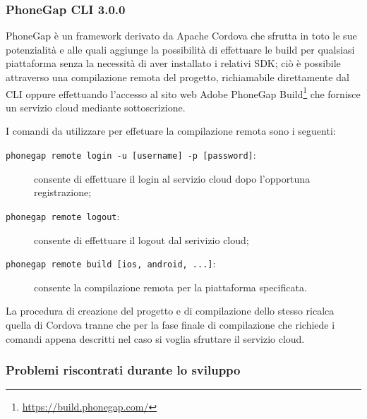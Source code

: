 \subsubsection{PhoneGap CLI 3.0.0}
PhoneGap è un framework derivato da Apache Cordova che sfrutta in toto le sue potenzialità e alle quali aggiunge la possibilità di effettuare le build per qualsiasi piattaforma senza la necessità di aver installato i relativi SDK; ciò è possibile attraverso una compilazione remota del progetto, richiamabile direttamente dal CLI oppure effettuando l'accesso al sito web Adobe PhoneGap Build\footnote{\url{https://build.phonegap.com/}} che fornisce un servizio cloud mediante sottoscrizione.

I comandi da utilizzare per effetuare la compilazione remota sono i seguenti:
\begin{description}
\item[\texttt{phonegap remote login -u [username] -p [password]}:] consente di effettuare il login al servizio cloud dopo l'opportuna registrazione;
\item[\texttt{phonegap remote logout}:] consente di effettuare il logout dal serivizio cloud;
\item[\texttt{phonegap remote build [ios, android, ...]}:] consente la compilazione remota per la piattaforma specificata.
\end{description}

La procedura di creazione del progetto e di compilazione dello stesso ricalca quella di Cordova tranne che per la fase finale di compilazione che richiede i comandi appena descritti nel caso si voglia sfruttare il servizio cloud.

\subsubsection{Problemi riscontrati durante lo sviluppo}
